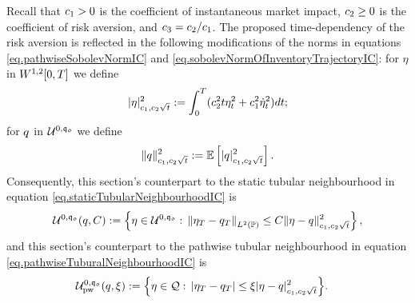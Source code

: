 \documentclass[10pt,a4paper]{article}
\begin{document}
Recall that $\coeffMarketImpact>0$ is the coefficient of instantaneous market impact, $\coeffRiskAversion\geq 0$ is the coefficient of risk aversion, and $\ratioAversionOverImpact=\coeffRiskAversion/\coeffMarketImpact$. The proposed time-dependency of the risk aversion is reflected in the following modifications of the norms in equations \eqref{eq.pathwiseSobolevNormIC} and \eqref{eq.sobolevNormOfInventoryTrajectoryIC}: for $\eta$ in $\sobolevSpaceOneTwo\timeWindow$ we define
\begin{equation}\label{eq.pathwiseSobolevNormTimeIC}
\lvert \eta \rvert \squared _{\coeffMarketImpact,\coeffRiskAversion\sqrt{t}}:= \intZeroTimeHorizon (\coeffRiskAversion\squared t \eta\squared_t + \coeffMarketImpact\squared \dotEta\squared_t) dt;
\end{equation}
for $\inventory$ in $\spaceUnbiasedInventoryTrajectoriesInitialConstraint$ we define
\begin{equation}\label{eq.sobolevNormTimeIC}
\lVert \inventory \rVert\squared_{\coeffMarketImpact,\coeffRiskAversion\sqrt{t} }
:=
\Expectation \left[ \lvert \inventory \rvert_{\coeffMarketImpact,\coeffRiskAversion\sqrt{t}}\squared \right].
\end{equation}
Consequently, this section's counterpart to the static tubular neighbourhood in equation \eqref{eq.staticTubularNeighbourhoodIC} is  
\begin{equation}\label{eq.staticTubularNeighbourhoodTimeIC}
\spaceUnbiasedInventoryTrajectoriesInitialConstraint (\inventory, C):=
\left\lbrace
\eta \in \spaceUnbiasedInventoryTrajectoriesInitialConstraint: \, 
\norm[\eta_\timeHorizon -\inventory_\timeHorizon]_{\Ltwo(\Prob)} \leq 
C \lVert \eta -\inventory\rVert\squared_{\coeffMarketImpact,\coeffRiskAversion\sqrt{t} }
\right\rbrace,
\end{equation}
and  this section's counterpart to the pathwise tubular neighbourhood in equation \eqref{eq.pathwiseTuburalNeighbourhoodIC} is 
\begin{equation}
\begin{split}\label{eq.pathwiseTubularNeighbourhoodTimeIC}
\spaceUnbiasedInventoryTrajectoriesInitialConstraint_{\text{pw}}(\inventory,\xi):=
\Big\lbrace
\eta \in \spaceInventoryTrajectories: \, 
\abs{\eta_\timeHorizon-\inventory_\timeHorizon} 
&\leq \xi\lvert \eta - \inventory\rvert \squared_{\coeffMarketImpact,\coeffRiskAversion\sqrt{t} }
\Big\rbrace.
\end{split}
\end{equation}
\end{document}
